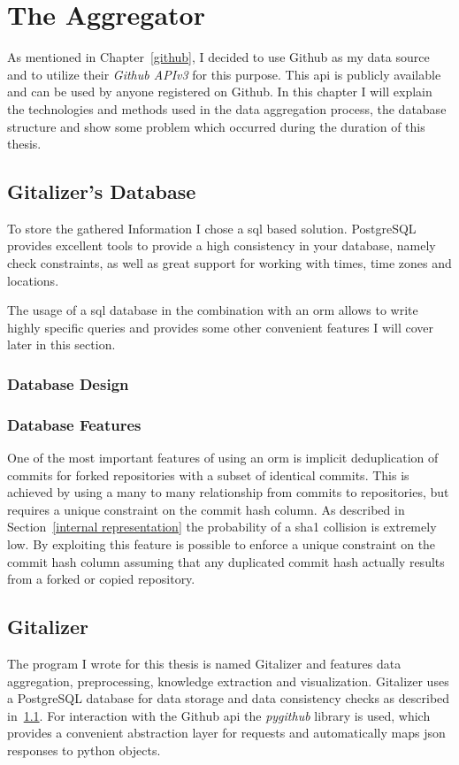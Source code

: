 \chapter{The Aggregator}\label{aggregator}
As mentioned in Chapter~\ref{github}, I decided to use Github as my data source and to utilize their \emph{Github APIv3} for this purpose.
This \ac{api} is publicly available and can be used by anyone registered on Github.
In this chapter I will explain the technologies and methods used in the data aggregation process, the database structure and show some problem which occurred during the duration of this thesis.


\section{Gitalizer's Database}\label{data-structure}
To store the gathered Information I chose a \ac{sql} based solution.
PostgreSQL provides excellent tools to provide a high consistency in your database, namely check constraints, as well as great support for working with times, time zones and locations.

The usage of a \ac{sql} database in the combination with an \ac{orm} allows to write highly specific queries and provides some other convenient features I will cover later in this section.

\subsection{Database Design}

\subsection{Database Features}
One of the most important features of using an \ac{orm} is implicit deduplication of commits for forked repositories with a subset of identical commits.
This is achieved by using a many to many relationship from commits to repositories, but requires a unique constraint on the commit hash column.
As described in Section~\ref{internal representation} the probability of a \ac{sha1} collision is extremely low.
By exploiting this feature is possible to enforce a unique constraint on the commit hash column assuming that any duplicated commit hash actually results from a forked or copied repository.



\section{Gitalizer}
The program I wrote for this thesis is named Gitalizer and features data aggregation, preprocessing, knowledge extraction and visualization.
Gitalizer uses a PostgreSQL database for data storage and data consistency checks as described in~\ref{data-structure}.
For interaction with the Github \ac{api} the \emph{pygithub} library is used, which provides a convenient abstraction layer for requests and automatically maps \ac{json} responses to python objects.


